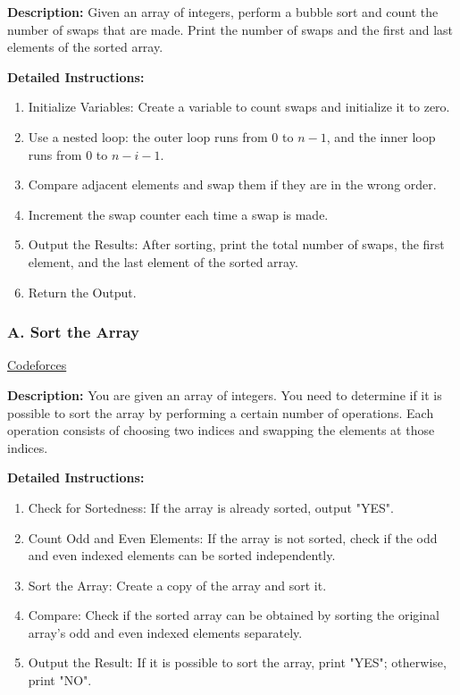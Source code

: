 \textbf{Description:} Given an array of integers, perform a bubble sort and count the number of swaps that are made. Print the number of swaps and the first and last elements of the sorted array.

\textbf{Detailed Instructions:}
\begin{enumerate}
    \item Initialize Variables: Create a variable to count swaps and initialize it to zero.
    \item Use a nested loop: the outer loop runs from 0 to $n-1$, and the inner loop runs from 0 to $n-i-1$.
    \item Compare adjacent elements and swap them if they are in the wrong order.
    \item Increment the swap counter each time a swap is made.
    \item Output the Results: After sorting, print the total number of swaps, the first element, and the last element of the sorted array.
    \item Return the Output.
\end{enumerate}

\subsubsection{A. Sort the Array}
\href{https://codeforces.com/problemset/problem/1360/A}{Codeforces}

\textbf{Description:} You are given an array of integers. You need to determine if it is possible to sort the array by performing a certain number of operations. Each operation consists of choosing two indices and swapping the elements at those indices.

\textbf{Detailed Instructions:}
\begin{enumerate}
    \item Check for Sortedness: If the array is already sorted, output "YES".
    \item Count Odd and Even Elements: If the array is not sorted, check if the odd and even indexed elements can be sorted independently.
    \item Sort the Array: Create a copy of the array and sort it.
    \item Compare: Check if the sorted array can be obtained by sorting the original array's odd and even indexed elements separately.
    \item Output the Result: If it is possible to sort the array, print "YES"; otherwise, print "NO".
\end{enumerate}

